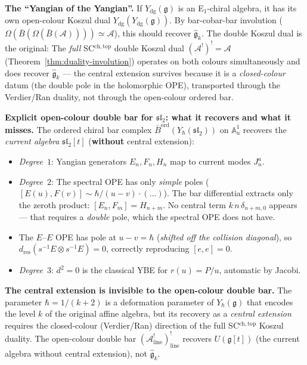 \documentclass[11pt]{article}
\newcommand{\cA}{\mathcal{A}}
\newcommand{\fg}{\mathfrak{g}}
\begin{document}
\medskip\noindent\textbf{The ``Yangian of the Yangian''.}\enspace
If $Y_{\mathrm{dg}}(\fg)$ is an E$_1$-chiral algebra, it has its
own open-colour Koszul dual
$Y_{\mathrm{dg}}(Y_{\mathrm{dg}}(\fg))$.  By bar-cobar-bar
involution
($\Omega(\bar{B}(\Omega(\bar{B}(\cA)))) \simeq \cA$),
this should recover $\widehat{\fg}_k$.  The double Koszul
dual is the original:
The \emph{full} SC${}^{\mathrm{ch,top}}$ double Koszul dual
$(\cA^!)^! = \cA$ (Theorem~\ref{thm:duality-involution})
operates on both colours simultaneously and does recover
$\widehat{\fg}_k$ --- the central extension survives because
it is a \emph{closed-colour} datum (the double pole in
the holomorphic OPE), transported through the Verdier/Ran
duality, not through the open-colour ordered bar.

\medskip\noindent\textbf{Explicit open-colour double bar for
$\mathfrak{sl}_2$: what it recovers and what it misses.}\enspace
The ordered chiral bar complex
$\bar{B}^{\mathrm{ord}}(Y_\hbar(\mathfrak{sl}_2))$ on
$\mathbb{A}^1_u$ recovers the \emph{current algebra}
$\mathfrak{sl}_2[t]$ (\textbf{without} central extension):
\begin{itemize}[nosep]
\item \emph{Degree~$1$}: Yangian generators $E_n, F_n, H_n$
  map to current modes $J^a_n$.
\item \emph{Degree~$2$}: The spectral OPE has only
  \emph{simple} poles ($[E(u), F(v)] \sim \hbar/(u{-}v)
  \cdot (\ldots)$).  The bar differential extracts only
  the zeroth product: $[E_n, F_m] = H_{n+m}$.  No
  central term $k\,n\,\delta_{n+m,0}$ appears ---
  that requires a \emph{double} pole, which the
  spectral OPE does not have.
\item The $E$--$E$ OPE has pole at $u - v = \hbar$
  (\emph{shifted off the collision diagonal}), so
  $d_{\mathrm{res}}(s^{-1}E \otimes s^{-1}E) = 0$,
  correctly reproducing $[e,e] = 0$.
\item \emph{Degree~$3$}: $d^2 = 0$ is the classical YBE for
  $r(u) = P/u$, automatic by Jacobi.
\end{itemize}
\textbf{The central extension is invisible to the
open-colour double bar.}  The parameter
$\hbar = 1/(k{+}2)$ is a deformation parameter of
$Y_\hbar(\fg)$ that encodes the level $k$ of the
original affine algebra, but its recovery as a
\emph{central extension} requires the closed-colour
(Verdier/Ran) direction of the full
SC${}^{\mathrm{ch,top}}$ Koszul duality.  The
open-colour double bar
$(\cA^!_{\mathrm{line}})^!_{\mathrm{line}}$ recovers
$U(\fg[t])$ (the current algebra without central
extension), not $\widehat{\fg}_k$.
\end{document}

